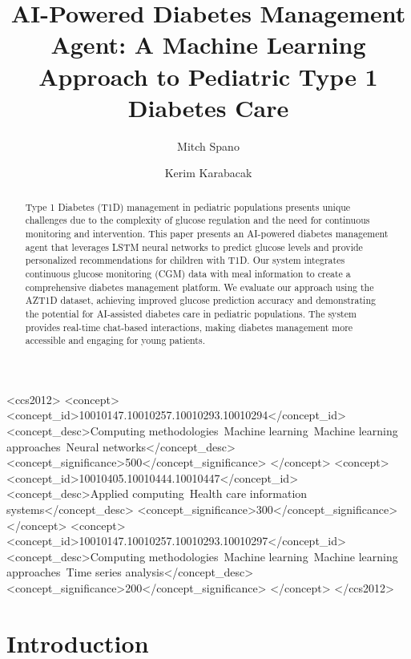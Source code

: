\documentclass[acmsmall]{acmart}
\title{AI-Powered Diabetes Management Agent: A Machine Learning Approach to Pediatric Type 1 Diabetes Care}
\author{Mitch Spano}
\affiliation{%
  \institution{The University of Texas at Austin}
  \city{Austin}
  \state{Texas}
  \country{USA}
}
\author{Kerim Karabacak}
\affiliation{%
  \institution{The University of Texas at Austin}
  \city{Austin}
  \state{Texas}
  \country{USA}
}
\begin{document}
\begin{abstract}
Type 1 Diabetes (T1D) management in pediatric populations presents unique challenges due to the complexity of glucose regulation and the need for continuous monitoring and intervention. This paper presents an AI-powered diabetes management agent that leverages LSTM neural networks to predict glucose levels and provide personalized recommendations for children with T1D. Our system integrates continuous glucose monitoring (CGM) data with meal information to create a comprehensive diabetes management platform. We evaluate our approach using the AZT1D dataset, achieving improved glucose prediction accuracy and demonstrating the potential for AI-assisted diabetes care in pediatric populations. The system provides real-time chat-based interactions, making diabetes management more accessible and engaging for young patients.
\end{abstract}

\begin{CCSXML}
<ccs2012>
  <concept>
    <concept_id>10010147.10010257.10010293.10010294</concept_id>
    <concept_desc>Computing methodologies~Machine learning~Machine learning approaches~Neural networks</concept_desc>
    <concept_significance>500</concept_significance>
  </concept>
  <concept>
    <concept_id>10010405.10010444.10010447</concept_id>
    <concept_desc>Applied computing~Health care information systems</concept_desc>
    <concept_significance>300</concept_significance>
  </concept>
  <concept>
    <concept_id>10010147.10010257.10010293.10010297</concept_id>
    <concept_desc>Computing methodologies~Machine learning~Machine learning approaches~Time series analysis</concept_desc>
    <concept_significance>200</concept_significance>
  </concept>
</ccs2012>
\end{CCSXML}



\maketitle

\section{Introduction}
\end{document}

